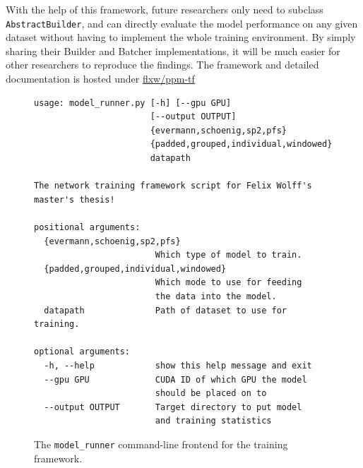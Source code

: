 With the help of this framework, future researchers only need to subclass \verb=AbstractBuilder=, and can directly evaluate the model performance on any given dataset without having to implement the whole training environment. By simply sharing their Builder and Batcher implementations, it will be much easier for other researchers to reproduce the findings. The framework and detailed documentation is hosted under \href{https://github.com/flxw/ppm-tf}{flxw/ppm-tf}

\begin{figure}
\centering
\begin{verbatim}
usage: model_runner.py [-h] [--gpu GPU]
                       [--output OUTPUT]
                       {evermann,schoenig,sp2,pfs}
                       {padded,grouped,individual,windowed}
                       datapath

The network training framework script for Felix Wolff's master's thesis!

positional arguments:
  {evermann,schoenig,sp2,pfs}
                        Which type of model to train.
  {padded,grouped,individual,windowed}
                        Which mode to use for feeding
                        the data into the model.
  datapath              Path of dataset to use for training.

optional arguments:
  -h, --help            show this help message and exit
  --gpu GPU             CUDA ID of which GPU the model
                        should be placed on to
  --output OUTPUT       Target directory to put model
                        and training statistics
\end{verbatim}
\caption{The \texttt{model\_runner} command-line frontend for the training framework.}
\label{fig:framework-frontend}
\end{figure}